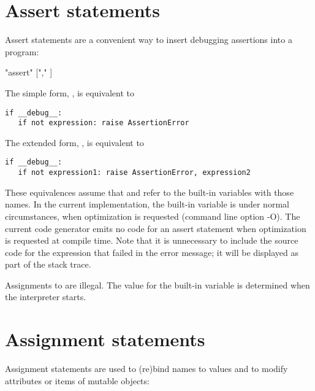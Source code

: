 \section{Assert statements \label{assert}}

Assert statements are a convenient way to insert
debugging assertions into a program:

\begin{productionlist}
             {"assert"  ["," ]}
\end{productionlist}

The simple form, , is equivalent to

\begin{verbatim}
if __debug__:
   if not expression: raise AssertionError
\end{verbatim}

The extended form, , is
equivalent to

\begin{verbatim}
if __debug__:
   if not expression1: raise AssertionError, expression2
\end{verbatim}

These equivalences assume that  and
 refer to the built-in
variables with those names.  In the current implementation, the
built-in variable  is  under normal
circumstances,  when optimization is requested (command line
option -O).  The current code generator emits no code for an assert
statement when optimization is requested at compile time.  Note that it
is unnecessary to include the source code for the expression that failed
in the error message;
it will be displayed as part of the stack trace.

Assignments to  are illegal.  The value for the
built-in variable is determined when the interpreter starts.


\section{Assignment statements \label{assignment}}

Assignment statements are used to
(re)bind names to values and to modify attributes or items of mutable
objects:

